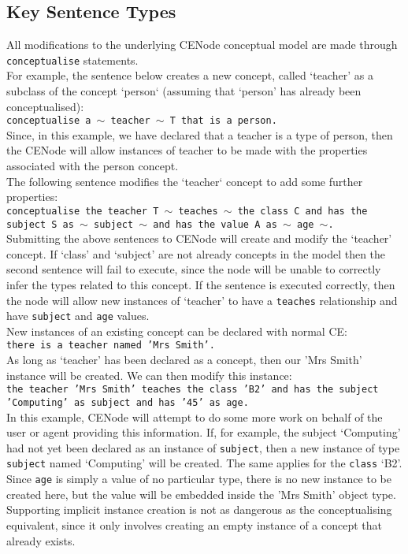 \documentclass{scrartcl}
\begin{document}
\subsection{Key Sentence Types}
All modifications to the underlying CENode conceptual model are made through \texttt{conceptualise} statements.\\

For example, the sentence below creates a new concept, called `teacher' as a subclass of the concept `person` (assuming that `person' has already been conceptualised):\\
\texttt{conceptualise a $\sim$ teacher $\sim$ T that is a person.}\\

Since, in this example, we have declared that a teacher is a type of person, then the CENode will allow instances of teacher to be made with the properties associated with the person concept.\\ 

The following sentence modifies the `teacher` concept to add some further properties:\\
\texttt{conceptualise the teacher T $\sim$ teaches $\sim$ the class C and has the subject S as $\sim$ subject $\sim$ and has the value A as $\sim$ age $\sim$.}\\

Submitting the above sentences to CENode will create and modify the `teacher' concept. If `class' and `subject' are not already concepts in the model then the second sentence will fail to execute, since the node will be unable to correctly infer the types related to this concept. If the sentence is executed correctly, then the node will allow new instances of `teacher' to have a \texttt{teaches} relationship and have \texttt{subject} and \texttt{age} values.\\

New instances of an existing concept can be declared with normal CE:\\
\texttt{there is a teacher named 'Mrs Smith'.}\\

As long as `teacher' has been declared as a concept, then our 'Mrs Smith' instance will be created. We can then modify this instance:\\
\texttt{the teacher 'Mrs Smith' teaches the class 'B2' and has the subject 'Computing' as subject and has '45' as age.}\\

In this example, CENode will attempt to do some more work on behalf of the user or agent providing this information. If, for example, the subject `Computing' had not yet been declared as an instance of \texttt{subject}, then a new instance of type \texttt{subject} named `Computing' will be created. The same applies for the \texttt{class} `B2'. Since \texttt{age} is simply a value of no particular type, there is no new instance to be created here, but the value will be embedded inside the 'Mrs Smith' object type. Supporting implicit instance creation is not as dangerous as the conceptualising equivalent, since it only involves creating an empty instance of a concept that already exists.\\
\end{document}
